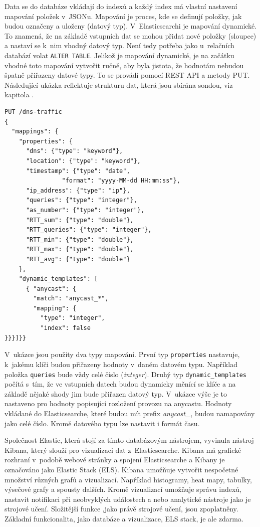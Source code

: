 \documentclass[thesis=M,czech]{src/FITthesis}[2019/12/23]
\begin{document}
Data se do databáze vkládají do indexů a každý index má vlastní nastavení mapování položek v~JSONu. Mapování je proces, kde se definují položky, jak budou označeny a uloženy (datový typ). V~Elasticsearchi je mapování dynamické. To znamená, že na základě vstupních dat se mohou přidat nové položky (sloupce) a nastaví se k~nim vhodný datový typ. Není tedy potřeba jako u~relačních databází volat \texttt{ALTER TABLE}. Jelikož je mapování dynamické, je na začátku vhodné toto mapování vytvořit ručně, aby byla jistota, že hodnotám nebudou špatně přiřazeny datové typy. To se provádí pomocí REST API a metody PUT. Následující ukázka reflektuje strukturu dat, která jsou sbírána sondou, viz kapitola .

\begin{verbatim}
PUT /dns-traffic
{
  "mappings": {
    "properties": {
      "dns": {"type": "keyword"},
      "location": {"type": "keyword"},
      "timestamp": {"type": "date", 
      			"format": "yyyy-MM-dd HH:mm:ss"},
      "ip_address": {"type": "ip"},
      "queries": {"type": "integer"},
      "as_number": {"type": "integer"},
      "RTT_sum": {"type": "double"},
      "RTT_queries": {"type": "integer"},
      "RTT_min": {"type": "double"},
      "RTT_max": {"type": "double"},
      "RTT_avg": {"type": "double"}
    },
    "dynamic_templates": [
      { "anycast": {
        "match": "anycast_*",
        "mapping": {
          "type": "integer",
          "index": false
}}}]}}
\end{verbatim}

V~ukázce jsou použity dva typy mapování. První typ \texttt{properties} nastavuje, k~jakému  klíči budou přiřazeny hodnoty v~daném datovém typu. Například položka \texttt{queries} bude vždy celé číslo (\textit{integer}). Druhý typ \linebreak \texttt{dynamic\_templates} počítá s~tím, že ve vstupních datech budou dynamicky měnící se klíče a na základě nějaké shody jim bude přiřazen datový typ. V~ukázce výše je to nastaveno pro hodnoty popisující rozložení provozu na anycastu. Hodnoty vkládané do Elasticsearche, které budou mít prefix \textit{anycast\_}, budou namapovány jako celé číslo. Kromě datového typu lze nastavit i formát času.

Společnost Elastic, která stojí za tímto databázovým nástrojem, vyvinula nástroj Kibana, který slouží pro vizualizaci dat z~Elasticsearche. Kibana má grafické rozhraní v~podobě webové stránky a spojení Elasticsearche a Kibany je označováno jako Elastic Stack (ELS). Kibana umožňuje vytvořit nespočetné množství různých grafů a vizualizací. Například histogramy, heat mapy, tabulky, výsečové grafy a spousty dalších. Kromě vizualizací umožňuje správu indexů, nastavit notifikaci při neobvyklých událostech a nebo analytické nástroje jako je strojové učení. Složitější funkce ,jako právě strojové učení, jsou zpoplatněny. Základní funkcionalita, jako databáze a vizualizace, ELS stack, je ale zdarma.
\end{document}
